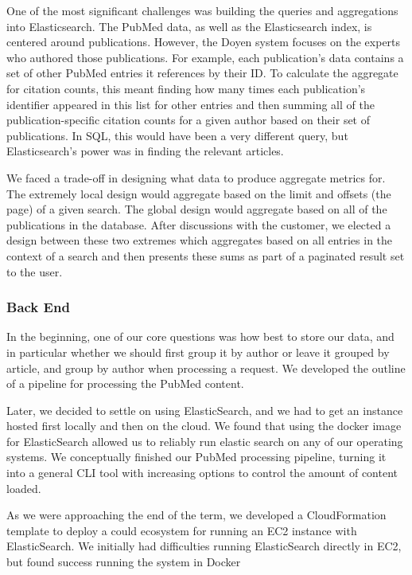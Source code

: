 One of the most significant challenges was building the queries and aggregations into Elasticsearch. The PubMed data, as well as the Elasticsearch index, is centered around publications. However, the Doyen system focuses on the experts who authored those publications. For example, each publication's data contains a set of other PubMed entries it references by their ID. To calculate the aggregate for citation counts, this meant  finding how many times each publication's identifier appeared in this list for other entries and then summing all of the publication-specific citation counts for a given author based on their set of publications. In SQL, this would have been a very different query, but Elasticsearch's power was in finding the relevant articles.

We faced a trade-off in designing what data to produce aggregate metrics for. The extremely local design would aggregate based on the limit and offsets (the page) of a given search. The global design would aggregate based on all of the publications in the database. After discussions with the customer, we elected a design between these two extremes which aggregates based on all entries in the context of a search and then presents these sums as part of a paginated result set to the user.

\subsubsection{Back End}

In the beginning, one of our core questions was how best to store our data, and in particular whether we should first group it by author or leave it grouped by article, and group by author when processing a request. We developed the outline of a pipeline for processing the PubMed content.

Later, we decided to settle on using ElasticSearch, and we had to get an instance hosted first locally and then on the cloud. We found that using the docker image for ElasticSearch allowed us to reliably run elastic search on any of our operating systems.  We conceptually finished our PubMed processing pipeline, turning it into a general CLI tool with increasing options to control the amount of content loaded.

As we were approaching the end of the term, we developed a CloudFormation template to deploy a could ecosystem for running an EC2 instance with ElasticSearch. We initially had difficulties running ElasticSearch directly in EC2, but found success running the system in Docker

